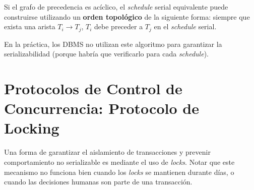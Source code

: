 \documentclass[a4paper, twoside]{article}
\begin{document}
Si el grafo de precedencia es acíclico, el \emph{schedule} serial
equivalente puede construirse utilizando un \textbf{orden topológico
}de la siguiente forma: siempre que exista una arista $T_{i}\to T_{j}$,
$T_{i}$ debe preceder a $T_{j}$ en el \emph{schedule }serial.

En la práctica, los DBMS no utilizan este algoritmo para garantizar
la serializabilidad (porque habría que verificarlo para cada \emph{schedule}).


\section{Protocolos de Control de Concurrencia: Protocolo de Locking}

Una forma de garantizar el aislamiento de transacciones y prevenir
comportamiento no serializable es mediante el uso de \emph{locks}.
Notar que este mecanismo no funciona bien cuando los \emph{locks}
se mantienen durante días, o cuando las decisiones humanas son parte
de una transacción.
\end{document}
